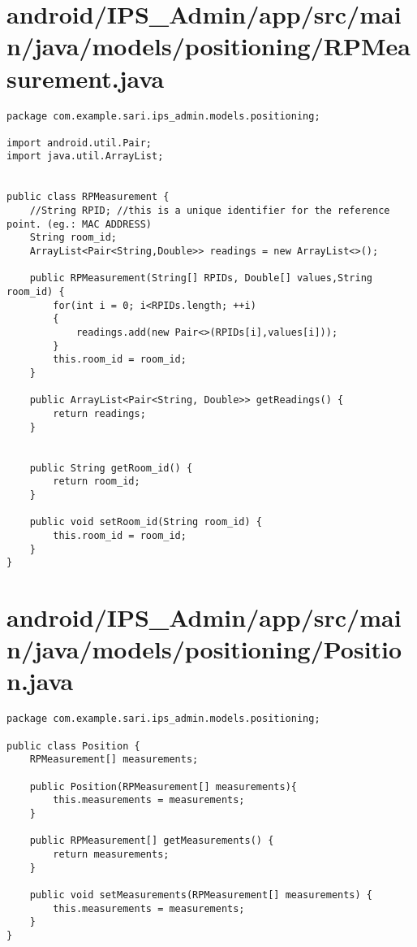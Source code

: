 \section{android/IPS\_Admin/app/src/main/java/models/positioning/RPMeasurement.java}
\begin{lstlisting}package com.example.sari.ips_admin.models.positioning;

import android.util.Pair;
import java.util.ArrayList;


public class RPMeasurement {
    //String RPID; //this is a unique identifier for the reference point. (eg.: MAC ADDRESS)
    String room_id;
    ArrayList<Pair<String,Double>> readings = new ArrayList<>();

    public RPMeasurement(String[] RPIDs, Double[] values,String room_id) {
        for(int i = 0; i<RPIDs.length; ++i)
        {
            readings.add(new Pair<>(RPIDs[i],values[i]));
        }
        this.room_id = room_id;
    }

    public ArrayList<Pair<String, Double>> getReadings() {
        return readings;
    }


    public String getRoom_id() {
        return room_id;
    }

    public void setRoom_id(String room_id) {
        this.room_id = room_id;
    }
}
\end{lstlisting}
\newpage
\section{android/IPS\_Admin/app/src/main/java/models/positioning/Position.java}
\begin{lstlisting}package com.example.sari.ips_admin.models.positioning;

public class Position {
    RPMeasurement[] measurements;

    public Position(RPMeasurement[] measurements){
        this.measurements = measurements;
    }

    public RPMeasurement[] getMeasurements() {
        return measurements;
    }

    public void setMeasurements(RPMeasurement[] measurements) {
        this.measurements = measurements;
    }
}
\end{lstlisting}
\newpage
